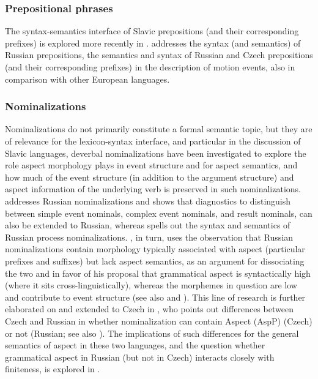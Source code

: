 \documentclass[output=paper,colorlinks,citecolor=brown]{langscibook}
\begin{document}
\subsubsection{Prepositional phrases} The syntax-semantics interface of Slavic prepositions (and their corresponding prefixes) is explored more recently in \citet{Biskup2019}. \citet{Romanova2007} addresses the syntax (and semantics) of Russian prepositions, \citet{Gehrke2008} the semantics and syntax of Russian and Czech prepositions (and their corresponding prefixes) in the description of motion events, also in comparison with other European languages.



\subsubsection{Nominalizations}

Nominalizations do not primarily constitute a formal semantic topic, but they are of relevance for the lexicon-syntax interface, and particular in the discussion of Slavic languages, deverbal nominalizations have been investigated to explore the role aspect morphology plays in event structure and for aspect semantics, and how much of the event structure (in addition to the argument structure) and aspect information of the underlying verb is preserved in such nominalizations. \citet{Schoorlemmer1995,schoorlemmer98} addresses Russian nominalizations and shows that diagnostics to distinguish between simple event nominals, complex event nominals, and result nominals, can also be extended to Russian, whereas \citet{zimmmermann2002} spells out the syntax and semantics of Russian process nominalizations. \citet{Tatevosov2011}, in turn, uses the observation that Russian nominalizations contain morphology typically associated with aspect (particular prefixes and suffixes) but lack aspect semantics, as an argument for dissociating the two and in favor of his proposal that grammatical aspect is syntactically high (where it sits cross-linguistically), whereas the morphemes in question are low and contribute to event structure (see also  and ). This line of research is further elaborated on and extended to Czech in \citet{biskup23adv}, who points out differences between Czech and Russian in whether nominalization can contain Aspect (AspP) (Czech) or not (Russian; see also \citealt{Schoorlemmer1995}). The implications of such differences for the general semantics of aspect in these two languages, and the question whether grammatical aspect in Russian (but not in Czech) interacts closely with finiteness, is explored in \citet{gehrkeadv23}.
\end{document}
